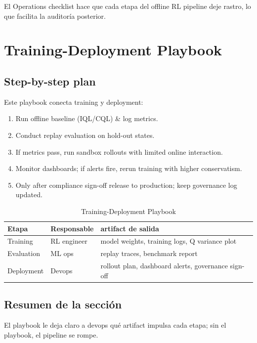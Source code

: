 \documentclass[a4paper]{article}
\begin{document}
El Operations checklist hace que cada etapa del offline RL pipeline deje rastro, lo que facilita la auditoría posterior.

\section{Training-Deployment Playbook}

\subsection{Step-by-step plan}

Este playbook conecta training y deployment:

\begin{enumerate}
    \item Run offline baseline (IQL/CQL) & log metrics.
    \item Conduct replay evaluation on hold-out states.
    \item If metrics pass, run sandbox rollouts with limited online interaction.
    \item Monitor dashboards; if alerts fire, rerun training with higher conservatism.
    \item Only after compliance sign-off release to production; keep governance log updated.
\end{enumerate}

\begin{table}[H]
\centering
\begin{tabular}{p{} p{} p{}}
\toprule
Etapa & Responsable & artifact de salida \\
\midrule
Training & RL engineer & model weights, training logs, Q variance plot \\
Evaluation & ML ops & replay traces, benchmark report \\
Deployment & Devops & rollout plan, dashboard alerts, governance sign-off \\
\bottomrule
\end{tabular}
\caption{Training-Deployment Playbook}
\end{table}

\subsection{Resumen de la sección}

El playbook le deja claro a devops qué artifact impulsa cada etapa; sin el playbook, el pipeline se rompe.
\end{document}
